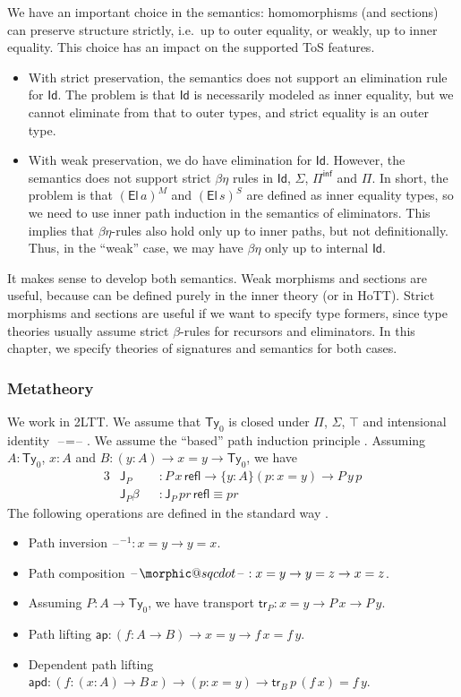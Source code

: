 \documentclass[12pt,a4paper,twoside,openany]{book}
\makeatletter
\DeclareRobustCommand{\sqcdot}{\mathbin{\mathpalette\morphic@sqcdot\relax}}
\newcommand{\morphic@sqcdot}[2]{%
  \sbox\z@{$\m@th#1\centerdot$}%
  \ht\z@=.33333\ht\z@
  \vcenter{\box\z@}%
}
\theoremstyle{remark}
\theoremstyle{definition}
\theoremstyle{theorem}
\newcommand{\mi}[1]{\mathit{#1}}
\newcommand{\ms}[1]{\mathsf{#1}}
\newcommand{\ap}{\ms{ap}}
\newcommand{\apd}{\ms{apd}}
\newcommand{\tr}{\ms{tr}}
\newcommand{\J}{\ms{J}}
\newcommand{\refl}{\mathsf{refl}}
\newcommand{\Ty}{\mathsf{Ty}}
\newcommand{\El}{\mathsf{El}}
\newcommand{\Id}{\mathsf{Id}}
\newcommand{\blank}{\mathord{\hspace{1pt}\text{--}\hspace{1pt}}}
\newcommand{\Piinf}{\Pi^{\mathsf{inf}}}
\makeatother
\begin{document}
We have an important choice in the semantics: homomorphisms (and sections) can
preserve structure strictly, i.e.\ up to outer equality, or weakly, up to inner
equality. This choice has an impact on the supported ToS features.
\begin{itemize}
\item
  With strict preservation, the semantics does not support an elimination
  rule for $\Id$. The problem is that $\Id$ is necessarily modeled as inner
  equality, but we cannot eliminate from that to outer types, and strict
  equality is an outer type.
\item
  With weak preservation, we do have elimination for $\Id$. However, the
  semantics does not support strict $\beta\eta$ rules in $\Id$, $\Sigma$,
  $\Piinf$ and $\Pi$.  In short, the problem is that $(\El\,a)^M$ and
  $(\El\,s)^S$ are defined as inner equality types, so we need to use inner path
  induction in the semantics of eliminators. This implies that $\beta\eta$-rules
  also hold only up to inner paths, but not definitionally. Thus, in the
  ``weak'' case, we may have $\beta\eta$ only up to internal $\Id$.
\end{itemize}
It makes sense to develop both semantics. Weak morphisms and sections are
useful, because can be defined purely in the inner theory (or in HoTT). Strict
morphisms and sections are useful if we want to specify type formers, since type
theories usually assume strict $\beta$-rules for recursors and eliminators. In
this chapter, we specify theories of signatures and semantics for both cases.

\subsubsection{Metatheory}

We work in 2LTT. We assume that $\Ty_0$ is closed under $\Pi$, $\Sigma$, $\top$
and intensional identity $\blank\!=\!\blank$. We assume the ``based'' path induction principle
\cite[Section~1.12.1]{hottbook}. Assuming $A : \Ty_0$, $x : A$ and $B : (y : A) \to x = y \to \Ty_0$,
we have
\begin{alignat*}{3}
  & \J_P      &&: P\,x\,\refl \to \{y : A\}(p : x = y) \to P\,y\,p\\
  & \J_P\beta &&: \J_P\,\mi{pr}\,\refl \equiv \mi{pr}
\end{alignat*}
The following operations are defined in the standard way
\cite[Section~2]{hottbook}.
\begin{itemize}
  \item Path inversion $\blank^{-1} : x = y \to y = x$.
  \item Path composition $\blank\!\sqcdot\!\blank : x = y \to y = z \to x = z$.
  \item Assuming $P : A \to \Ty_0$, we have transport $\tr_P : x = y \to P\,x \to P\,y$.
  \item Path lifting $\ap : (f : A \to B) \to x = y \to f\,x = f\,y$.
  \item Dependent path lifting $\apd : (f : (x : A) \to B\,x) \to (p : x = y) \to \tr_B\,p\,(f\,x) = f\,y$.
\end{itemize}
\end{document}
